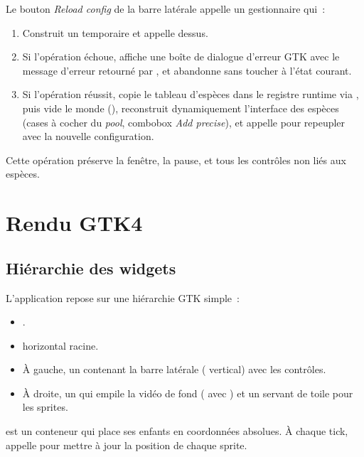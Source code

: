 Le bouton \emph{Reload config} de la barre latérale appelle un
gestionnaire qui~:

\begin{enumerate}
  \item Construit un  temporaire et appelle
     dessus.
  \item Si l'opération échoue, affiche une boîte de dialogue
    d'erreur GTK avec le message d'erreur retourné par
    , et abandonne sans toucher à l'état
    courant.
  \item Si l'opération réussit, copie le tableau d'espèces dans le
    registre runtime via , puis vide le monde
    (), reconstruit dynamiquement l'interface
    des espèces (cases à cocher du \emph{pool}, combobox
    \emph{Add precise}), et appelle  pour
    repeupler avec la nouvelle configuration.
\end{enumerate}

Cette opération préserve la fenêtre, la pause, et tous les
contrôles non liés aux espèces.

\section{Rendu GTK4}

\subsection{Hiérarchie des widgets}

L'application repose sur une hiérarchie GTK simple~:

\begin{itemize}
  \item {}.
  \item {} horizontal racine.
  \item À gauche, un  contenant la barre
    latérale ( vertical) avec les contrôles.
  \item À droite, un  qui empile la vidéo de
    fond ( avec ) et un
     servant de toile pour les sprites.
\end{itemize}

 est un conteneur qui place ses enfants en
coordonnées absolues. À chaque tick, 
appelle  pour mettre à jour la position
de chaque sprite.


